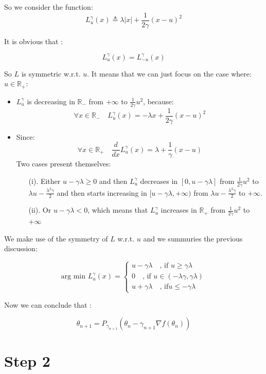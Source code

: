 	So we consider the function:
	$$L^{\gamma}_u(x)\triangleq \lambda \vert x \vert+ \frac{1}{2 \gamma}( x - u)^2$$
	
	It is obvious that :
	
	$$L^{\gamma}_u(x) = L^{\gamma}_{-u}(x)$$
	
	So $L$ is symmetric w.r.t. $u$. It means that we can just focus on the case where: $u \in \mathbb{R}_+$:
	
	\begin{itemize}
		\item $L^{\gamma}_u$ is decreasing in $ \mathbb{R}_- $ from $+\infty$ to $\frac{1}{2 \gamma}u^2$, because:
		$$\forall x \in \mathbb{R}_- \quad L^{\gamma}_u(x)=-\lambda x + \frac{1}{2 \gamma}( x - u)^2$$
		\item  Since: 
		$$\forall x \in \mathbb{R}_+ \quad \frac{d}{dx}L^{\gamma}_u(x)=\lambda + \frac{1}{\gamma} (x-u)$$
		Two cases present themselves:
		\begin{itemize}
			\item [(i). ] Either $u-\gamma \lambda \geq 0 $ and then  $L^{\gamma}_u$ decreases in $ [0,u-\gamma \lambda]$ from $\frac{1}{2 \gamma}u^2$ to $\lambda u -\frac{\lambda^2 \gamma}{2} $ and then starts increasing in $[u-\gamma \lambda,+\infty)$ from $\lambda u -\frac{\lambda^2 \gamma}{2} $ to $+\infty$.
			
			\item[(ii). ] Or $u-\gamma \lambda < 0 $, which means that $L^{\gamma}_u$ increases in $\mathbb{R}_+$ from $\frac{1}{2 \gamma}u^2$ to $+\infty$
		\end{itemize}
	\end{itemize}
	
	We make use of the symmetry of $L$ w.r.t. $u$ and we summuries the previous discussion: 
	
	$$\text{arg min }L^{\gamma}_u(x)=
	\begin{cases}
	u-\gamma \lambda \quad \text{, if } u\geq \gamma \lambda \\
	0 \quad \text{, if } u \in (-\lambda \gamma,\gamma \lambda)\\
	u+\gamma \lambda \quad \text{, if} u\leq -\gamma \lambda
	\end{cases}$$
	
	Now we can conclude that :
	
	$$\theta_{n+1}=P_{\gamma_{n+1}} (\theta_n-\gamma_{n+1}\nabla f(\theta_n))$$
	
	\section*{Step 2}
	~\\
	
